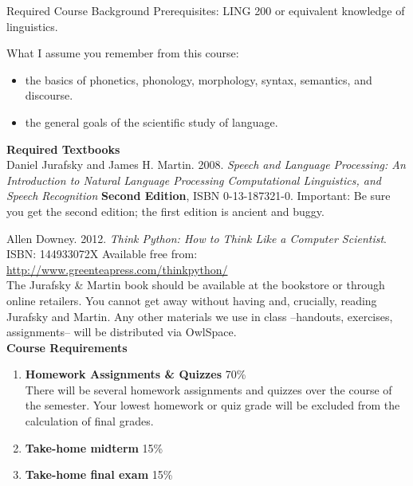 \documentclass [11pt]{article}
\begin{document}
Required Course Background Prerequisites: LING 200 or equivalent knowledge of linguistics.

What I assume you remember from this course:
\begin{itemize}
     \item the basics of phonetics, phonology, morphology, syntax, semantics, and discourse.
     \item the general goals of the scientific study of language.
\end{itemize}

{\bf Required Textbooks}\\

Daniel Jurafsky and James H. Martin. 2008. \emph{Speech and Language Processing: An Introduction to Natural Language Processing Computational Linguistics, and Speech Recognition} \textbf{Second Edition}, ISBN 0-13-187321-0. Important: Be sure you get the second edition;  the first edition is ancient and buggy.

Allen Downey. 2012. \emph{Think Python: How to Think Like a Computer Scientist}. ISBN: 144933072X  Available free from: \url{http://www.greenteapress.com/thinkpython/} \\

The Jurafsky \& Martin book should be available at the bookstore or through online retailers.  You cannot get away without having and, crucially, reading Jurafsky and Martin.  Any other materials we use in class --handouts, exercises, assignments-- will be distributed via OwlSpace.  \\

 {\bf Course Requirements}\\
  \begin{enumerate}
       \item \textbf{Homework Assignments \& Quizzes} \hfill{} 70\%\\
	    There will be several homework assignments and quizzes over the course of the semester.  Your lowest homework or quiz grade will be excluded from the calculation of final grades.
	
       \item \textbf{Take-home midterm} \hfill{} 15\%\\
	
       \item \textbf{Take-home final exam} \hfill{} 15\%\\
       
  \end{enumerate}
\ \\
\end{document}
